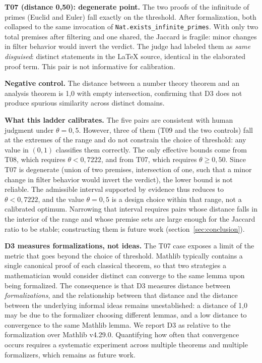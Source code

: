 \documentclass[12pt,a4paper]{article}
\theoremstyle{remark}
\begin{document}
\textbf{T07 (distance 0{,}50): degenerate point.} The two proofs of the infinitude of primes (Euclid and Euler) fall exactly on the threshold. After formalization, both collapsed to the same invocation of \texttt{Nat.exists\_infinite\_primes}. With only two total premises after filtering and one shared, the Jaccard is fragile: minor changes in filter behavior would invert the verdict. The judge had labeled them as \textit{same disguised}: distinct statements in the LaTeX source, identical in the elaborated proof term. This pair is not informative for calibration.

\textbf{Negative control.} The distance between a number theory theorem and an analysis theorem is 1{,}0 with empty intersection, confirming that D3 does not produce spurious similarity across distinct domains.

\textbf{What this ladder calibrates.} The five pairs are consistent with human judgment under $\theta = 0{,}5$. However, three of them (T09 and the two controls) fall at the extremes of the range and do not constrain the choice of threshold: any value in $(0,1)$ classifies them correctly. The only effective bounds come from T08, which requires $\theta < 0{,}7222$, and from T07, which requires $\theta \geq 0{,}50$. Since T07 is degenerate (union of two premises, intersection of one, such that a minor change in filter behavior would invert the verdict), the lower bound is not reliable. The admissible interval supported by evidence thus reduces to $\theta < 0{,}7222$, and the value $\theta = 0{,}5$ is a design choice within that range, not a calibrated optimum. Narrowing that interval requires pairs whose distance falls in the interior of the range and whose premise sets are large enough for the Jaccard ratio to be stable; constructing them is future work (section~\ref{sec:conclusion}).

\textbf{D3 measures formalizations, not ideas.} The T07 case exposes a limit of the metric that goes beyond the choice of threshold. Mathlib typically contains a single canonical proof of each classical theorem, so that two strategies a mathematician would consider distinct can converge to the same lemma upon being formalized. The consequence is that D3 measures distance between \textit{formalizations}, and the relationship between that distance and the distance between the underlying informal ideas remains unestablished: a distance of 1{,}0 may be due to the formalizer choosing different lemmas, and a low distance to convergence to the same Mathlib lemma. We report D3 as relative to the formalization over Mathlib v4.29.0. Quantifying how often that convergence occurs requires a systematic experiment across multiple theorems and multiple formalizers, which remains as future work.
\end{document}
